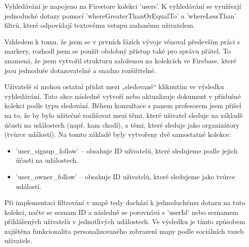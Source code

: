 Vyhledávání je napojeno na Firestore kolekci 'users'. K vyhledávání se využívají jednoduché dotazy pomocí 'whereGreaterThanOrEqualTo' a 'whereLessThan' filtrů, které odpovídají textovému vstupu zadanému uživatelem.

Vzhledem k tomu, že jsem se v prvních fázích vývoje věnoval především práci s markery, rozhodl jsem se použít obdobný přístup také pro správu přátel. To znamená, že jsem vytvořil strukturu založenou na kolekcích ve Firebase, které jsou jednoduše dotazovatelné a snadno rozšiřitelné.

Uživatelé si mohou ostatní přidat mezi „sledované“ kliknutím ve výsledku vyhledávání. Tato akce následně vytvoří nebo aktualizuje dokument v příslušné kolekci podle typu sledování. Během konzultace s panem profesorem jsem přišel na to, že by bylo užitečné rozlišovat mezi těmi, které uživatel sleduje na základě účasti na událostech (např. kam chodí), a těmi, které sleduje jako organizátory (tvůrce událostí). Na tomto základě byly vytvořeny dvě samostatné kolekce:

\begin{itemize}
    \item 'user\_signup\_follow' – obsahuje ID uživatelů, které sledujeme podle jejich účasti na událostech.
    \item 'user\_owner\_follow' – obsahuje ID uživatelů, které sledujeme jako tvůrce událostí.
\end{itemize}

Při implementaci filtrování v mapě tedy dochází k jednoduchému dotazu na tuto kolekci, načte se seznam ID a následně se porovnává s 'userId' nebo seznamem přihlášených uživatelů v jednotlivých událostech. Ve výsledku je tímto způsobem zajištěna funkcionalita personalizovaného zobrazení mapy podle sociálních vazeb uživatele.